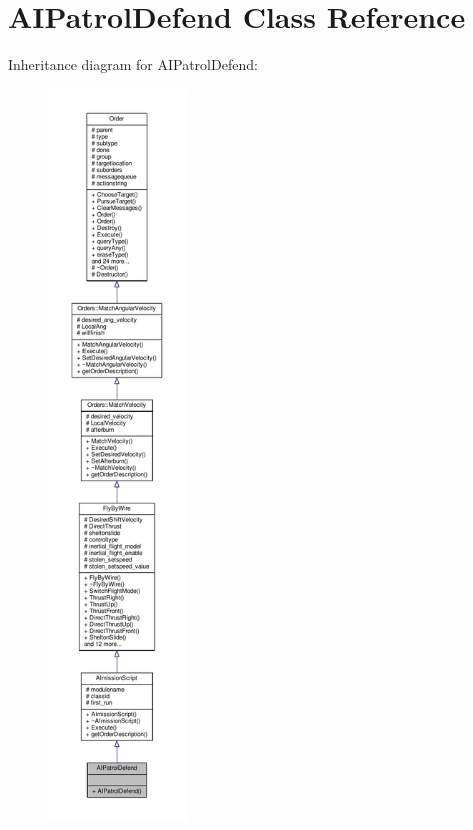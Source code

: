 \hypertarget{classAIPatrolDefend}{}\section{A\+I\+Patrol\+Defend Class Reference}
\label{classAIPatrolDefend}


Inheritance diagram for A\+I\+Patrol\+Defend\+:
\nopagebreak
\begin{figure}[H]
\begin{center}
\leavevmode
\includegraphics[height=550pt]{dc/d3a/classAIPatrolDefend__inherit__graph}
\end{center}
\end{figure}


